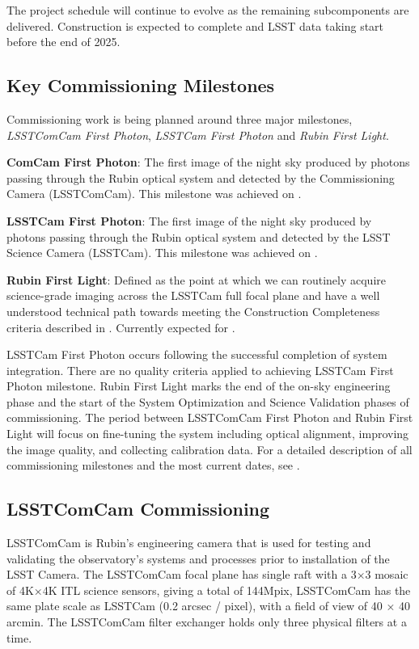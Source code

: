 The project schedule will continue to evolve as the remaining subcomponents are delivered. 
Construction is expected to complete and LSST data taking start before the end of 2025.

\subsection{Key Commissioning Milestones}
\label{ssec:commissioning-milestones}

Commissioning work is being planned around three major milestones, \textit{LSSTComCam First Photon}, \textit{LSSTCam First Photon} and \textit{Rubin First Light}. 

\textbf{ComCam First Photon}: The first image of the night sky produced by photons passing through the Rubin optical system and detected by the Commissioning Camera (LSSTComCam). 
This milestone was achieved on \ccfpdate. 

\textbf {LSSTCam First Photon}: The first image of the night sky produced by photons passing through the Rubin optical system and detected by the LSST Science Camera (LSSTCam).
This milestone was achieved on \lcfpdate. 

\textbf {Rubin First Light}: Defined as the point at which we can routinely acquire science-grade imaging across the LSSTCam full focal plane and have a well understood technical path towards meeting the Construction Completeness criteria   described in .
Currently expected for \rfldate. 

LSSTCam First Photon occurs following the successful completion of system integration. 
There are no quality criteria applied to achieving  LSSTCam First Photon  milestone. 
Rubin First Light  marks the end of the  on-sky engineering phase and the start of the System Optimization and Science Validation phases of commissioning.
The period between LSSTComCam First Photon and Rubin First Light will focus on fine-tuning the system including optical alignment,  improving the image quality, and collecting calibration data.
For a detailed description of all  commissioning milestones and the most current dates, see .

\subsection{LSSTComCam Commissioning}
\label{ssec:commissioning-comcam}

LSSTComCam is Rubin's engineering camera that is used for testing and validating the observatory's systems and processes prior to installation of the LSST Camera.
The LSSTComCam focal plane has single raft with a 3×3 mosaic of 4K×4K ITL science sensors, giving a total of 144Mpix, 
LSSTComCam has the same plate scale as LSSTCam (0.2 arcsec / pixel), with a field of view of 40 × 40 arcmin.
The LSSTComCam filter exchanger holds only three physical filters at a time.

